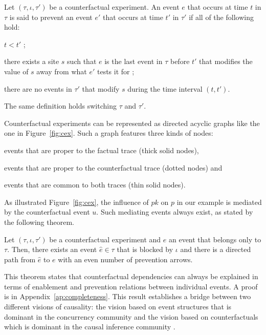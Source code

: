 \begin{definition}[Prevention]
  Let $(\tau, \iota, \tau')$ be a counterfactual experiment. An event
  $e$ that occurs at time $t$ in $\tau$ is said to prevent an event
  $e'$ that occurs at time $t'$ in $\tau'$ if all of the following
  hold:
  \begin{inparaenum}[(1)]
  \item \label{inhibition:time} $t < t'$ ;
  \item \label{inhibition:breaks} there exists a site $s$ such that
    $e$ is the last event in $\tau$ before $t'$ that modifies the
    value of $s$ away from what $e'$ tests it for ;
  \item \label{inhibition:nointf} there are no events in $\tau'$ that
    modify $s$ during the time interval $(t, t')$.
  \end{inparaenum}
  The same definition holds switching $\tau$ and $\tau'$.
\end{definition}

Counterfactual experiments can be represented as directed acyclic
graphs like the one in Figure~\ref{fig:cex}. Such a graph features
three kinds of nodes:
\begin{inparaenum}[]
\item events that are proper to the factual trace (thick solid nodes),
\item events that are proper to the counterfactual trace (dotted
  nodes) and
\item events that are common to both traces (thin solid nodes).
\end{inparaenum}

As illustrated Figure~\ref{fig:cex}, the influence of $pk$ on $p$ in
our example is mediated by the counterfactual event $u$. Such
mediating events always exist, as stated by the following theorem.

\begin{theorem}
  \label{thm:completeness}
  Let $(\tau, \iota, \tau')$ be a counterfactual experiment and $e$ an
  event that belongs only to $\tau$. Then, there exists an event
  $\hat e \in \tau$ that is blocked by $\iota$ and there is a directed
  path from $\hat e$ to $e$ with an even number of prevention arrows.
\end{theorem}
\noindent This theorem states that counterfactual dependencies can
always be explained in terms of enablement and prevention relations
between individual events. A proof is in
Appendix~\ref{ap:completeness}. This result establishes a bridge
between two different visions of causality: the vision based on event
structures \cite{winskel1986event} that is dominant in the concurrency
community and the vision based on counterfactuals which is dominant in
the causal inference community \cite{pearl2009causality}.

